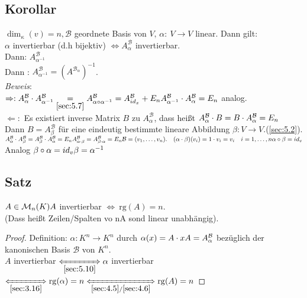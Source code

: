 \subsection{Korollar}\label{sec:\thesubsection}
$\dim_\kappa(v) =n, \mathcal{B}$ geordnete Basis von $V,\, \alpha:\:V\to V$ linear. Dann gilt:\\
$\alpha$ invertierbar (d.h bijektiv) $\Leftrightarrow A^{\mathcal{B}}_\alpha$ invertierbar.\\
Dann: $A^{\mathcal{B}}_{\alpha^{-1}}$\\
Dann : $A^{\mathcal{B}}_{\alpha^{-1}} = (A^{\mathcal{B}_\alpha})^{-1}$.\\
\emph{Beweis}:\\
$\Rightarrow: A^{\mathcal{B}}_\alpha \cdot A^{\mathcal{B}}_{\alpha^{-1}} \underset{\ref{sec:5.7}}{=} A^{\mathcal{B}}_{\alpha \circ \alpha^{-1}} = A^{\mathcal{B}}_{id_x} + E_n\\
A^{\mathcal{B}}_{\alpha^{-1}} \cdot A^{\mathcal{B}}_\alpha = E_n$ analog.\\
$\Leftarrow:$ Es existiert inverse Matrix $B$ zu $A^{\mathcal{B}}_\alpha$, dass hei\ss t $A^{\mathcal{B}}_\alpha \cdot B = B \cdot A^{\mathcal{B}}_\alpha = E_n$\\
Dann $B = A^{\mathcal{B}}_{\beta}$ für eine eindeutig bestimmte lineare Abbildung $\beta: V \to V.$(\ref{sec:5.2}).\\
$A^{\mathcal{B}}_\alpha \cdot A^{\mathcal{B}}_\beta = A^{\mathcal{B}}_\beta \cdot A^{\mathcal{B}}_\alpha = E_n\\
A^{\mathcal{B}}_{\alpha \cdot \beta} = A^{\mathcal{B}}_{\beta \cdot \alpha} = E_n\\
\mathcal{B} = (v_1,\ldots,v_n).\quad (\alpha \cdot \beta)(v_i) = 1 \cdot v_i = v_i\quad i = 1,\ldots,n\\
\alpha \circ \beta = id_v$\\
Analog $\beta \circ \alpha = id_v\\
\beta = \alpha^{-1}$
\subsection{Satz}\label{sec:\thesubsection}
$A \in \mathcal{M}_n(K)\\
A$ invertierbar $\Leftrightarrow\ \mathrm{rg}(A) = n$.\\
(Dass hei\ss t Zeilen/Spalten vo nA sond linear unabhängig).
\begin{proof}
Definition: $\alpha : K^n \to K^n$ durch $\alpha(x) = A \cdot x\\
A = A^{\mathcal{B}}_\alpha$ bezüglich der kanonischen Basis $\mathcal{B}$ von $K^n$.\\
$A$ invertierbar $\xLeftrightarrow[\ref{sec:5.10}]{} \alpha$ invertierbar $\xLeftrightarrow[\ref{sec:3.16}]{} \mathrm{rg}(\alpha)=n \xLeftrightarrow[\ref{sec:4.5}/\ref{sec:4.6}]{} \mathrm{rg}(A) = n$
\end{proof}
